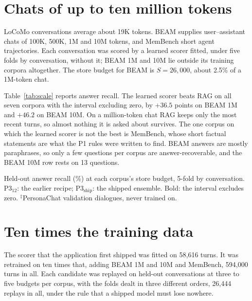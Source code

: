 \section{Chats of up to ten million tokens}
\label{sec:scale}

LoCoMo conversations average about 19K tokens. BEAM \cite{tavakoli2026beam}
supplies user--assistant chats of 100K, 500K, 1M and 10M tokens, and MemBench
\cite{tan2025membench} short agent trajectories. Each conversation was scored
by a learned scorer fitted, under five folds by conversation, without it;
BEAM 1M and 10M lie outside its training corpora altogether. The store budget
for BEAM is $S=26{,}000$, about 2.5\% of a 1M-token chat.

Table~\ref{tab:scale} reports answer recall. The learned scorer beats RAG on
all seven corpora with the interval excluding zero, by $+36.5$ points on BEAM
1M and $+46.2$ on BEAM 10M. On a million-token chat RAG keeps only the most
recent turns, so almost nothing it is asked about survives. The one corpus on
which the learned scorer is not the best is MemBench, whose short factual
statements are what the P1 rules were written to find. BEAM answers are mostly
paraphrases, so only a few questions per corpus are answer-recoverable, and
the BEAM 10M row rests on 13 questions.

\begin{table}[htbp]
\caption[Held-out answer recall (\%) at each corpus's store budget, 5-fold by conversation.]{Held-out answer recall (\%) at each corpus's store budget, 5-fold by
conversation. P3$_{12}$: the earlier recipe; P3$_{\mathrm{ship}}$: the shipped
ensemble. Bold: the interval excludes zero. $^\ddagger$PersonaChat validation
dialogues, never trained on.}
\label{tab:scale}
\centering
\fontsize{10}{12}\selectfont
\begin{adjustbox}{max width=\textwidth}\end{adjustbox}
\end{table}

\section{Ten times the training data}
\label{sec:retrain}

The scorer that the application first shipped was fitted on 58{,}616 turns.
It was retrained on ten times that, adding BEAM 1M and 10M and MemBench,
594{,}000 turns in all. Each candidate was replayed on held-out conversations
at three to five budgets per corpus, with the folds dealt in three different
orders, 26{,}444 replays in all, under the rule that a shipped model must lose
nowhere.

